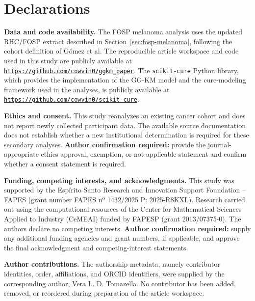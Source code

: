 \section{Declarations}\label{sec:declarations}

\textbf{Data and code availability.} The FOSP melanoma analysis uses the updated RHC/FOSP extract described in Section~\ref{sec:fosp-melanoma}, following the cohort definition of G\'omez et al.\cite{gomez2023promotion} The reproducible article workspace and code used in this study are publicly available at \href{https://github.com/cowvin0/ggkm_paper}{\texttt{https://github.com/cowvin0/ggkm\_paper}}. The \texttt{scikit-cure} Python library, which provides the implementation of the GG-KM model and the cure-modeling framework used in the analyses, is publicly available at \href{https://github.com/cowvin0/scikit-cure}{\texttt{https://github.com/cowvin0/scikit-cure}}.

\textbf{Ethics and consent.} This study reanalyzes an existing cancer cohort and does not report newly collected participant data. The available source documentation does not establish whether a new institutional determination is required for these secondary analyses. \textbf{Author confirmation required:} provide the journal-appropriate ethics approval, exemption, or not-applicable statement and confirm whether a consent statement is required.

\textbf{Funding, competing interests, and acknowledgments.} This study was supported by the Espírito Santo Research and Innovation Support Foundation – FAPES (grant number FAPES nº 1432/2025 P: 2025-R8KXL).
{Research carried out using the computational resources of the Center for
Mathematical Sciences Applied to Industry (CeMEAI) funded by FAPESP
(grant 2013/07375-0).} The authors declare no competing interests.
\textbf{Author confirmation required:} supply any additional funding
agencies and grant numbers, if applicable, and approve the final
acknowledgment and competing-interest statements.

\textbf{Author contributions.} The authorship metadata, namely contributor identities, order, affiliations, and ORCID identifiers, were supplied by the corresponding author, Vera L. D. Tomazella. No contributor has been added, removed, or reordered during preparation of the article workspace.

